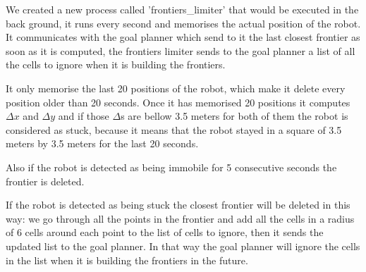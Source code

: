 We created a new process called 'frontiers\_limiter' that would be executed in the back ground, it runs every second and memorises the actual position of the robot.
It communicates with the goal planner which send to it the last closest frontier as soon as it is computed, the frontiers limiter sends to the goal planner a list of all the cells to ignore when it is building the frontiers.

It only memorise the last 20 positions of the robot, which make it delete every position older than 20 seconds.
Once it has memorised 20 positions it computes $\Delta x$ and $\Delta y$ and if those $\Delta$s are bellow 3.5 meters for both of them the robot is considered as stuck, because it means that the robot stayed in a square of 3.5 meters by 3.5 meters for the last 20 seconds.

Also if the robot is detected as being immobile for 5 consecutive seconds the frontier is deleted.

If the robot is detected as being stuck the closest frontier will be deleted in this way: we go through all the points in the frontier and add all the cells in a radius of 6 cells around each point to the list of cells to ignore, then it sends the updated list to the goal planner.
In that way the goal planner will ignore the cells in the list when it is building the frontiers in the future.

